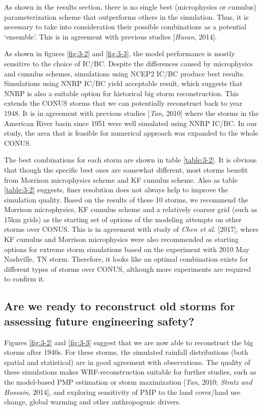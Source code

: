 As shown in the results section, there is no single best (microphysics or cumulus) parameterization scheme that outperforms others in the simulation. Thus, it is necessary to take into consideration their possible combinations as a potential ‘ensemble’. This is in agreement with previous studies [\textit{Hasan}, 2014].

As shown in figures \ref{fig:3-2} and \ref{fig:3-3}, the model performance is mostly sensitive to the choice of IC/BC. Despite the differences caused by microphysics and cumulus schemes, simulations using NCEP2 IC/BC produce best results. Simulations using NNRP IC/BC yield acceptable result, which suggests that NNRP is also a suitable option for historical big storm reconstruction. This extends the CONUS storms that we can potentially reconstruct back to year 1948. It is in agreement with previous studies [\textit{Tan}, 2010] where the storms in the American River basin since 1951 were well simulated using NNRP IC/BC. In our study, the area that is feasible for numerical approach was expanded to the whole CONUS.

The best combinations for each storm are shown in table \ref{table:3-2}. It is obvious that though the specific best ones are somewhat different, most storms benefit from Morrison microphysics scheme and KF cumulus scheme. Also as table \ref{table:3-2} suggests, finer resolution does not always help to improve the simulation quality. Based on the results of these 10 storms, we recommend the Morrison microphysics, KF cumulus scheme and a relatively coarser grid (such as 15km grids) as the starting set of options of the modeling attempts on other storms over CONUS. This is in agreement with study of \textit{Chen et al.} [2017], where KF cumulus and Morrison microphysics were also recommended as starting options for extreme storm simulations based on the experiment with 2010 May Nashville, TN storm. Therefore, it looks like an optimal combination exists for different types of storms over CONUS, although more experiments are required to confirm it.

\subsection{Are we ready to reconstruct old storms for assessing future engineering safety?}

Figures \ref{fig:3-2} and \ref{fig:3-3} suggest that we are now able to reconstruct the big storms after 1940s. For these storms, the simulated rainfall distributions (both spatial and statistical) are in good agreement with observations. The quality of these simulations makes WRF-reconstruction suitable for further studies, such as the model-based PMP estimation or storm maximization [\textit{Tan}, 2010; \textit{Stratz and Hossain}, 2014], and exploring sensitivity of PMP to the land cover/land use change, global warming and other anthropogenic drivers.

